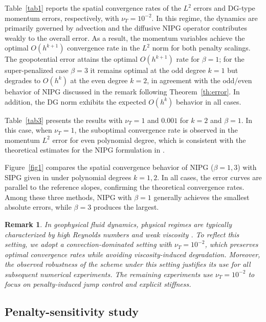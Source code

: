 \documentclass[pdflatex,sn-mathphys-num]{sn-jnl}%
\theoremstyle{thmstyleone}%
\theoremstyle{thmstyletwo}%
\newtheorem{remark}{Remark}%
\theoremstyle{thmstylethree}%
\begin{document}
Table~\ref{tab1} reports the spatial convergence rates of the $L^2$ errors and DG-type momentum errors, respectively, with $\nu_{T}=10^{-2}$. 
In this regime, the dynamics are primarily governed by advection and the diffusive NIPG operator contributes weakly to the overall error. 
As a result, the momentum variables achieve the optimal $O(h^{k+1})$ convergence rate in the $L^2$ norm for both penalty scalings. 
The geopotential error attains the optimal $O(h^{k+1})$ rate for $\beta=1$; for the super-penalized case $\beta=3$ it remains optimal at the odd degree $k=1$ but degrades to $O(h^{k})$ at the even degree $k=2$, in agreement with the odd/even behavior of NIPG discussed in the remark following Theorem~\ref{th:error}. In addition, the DG norm exhibits the expected $O(h^{k})$ behavior in all cases.

Table~\ref{tab3} presents the results with $\nu_{T}=1$ and $0.001$ for $k=2$ and $\beta=1$. In this case, when $\nu_{T}=1$, the suboptimal convergence rate is observed in the momentum $L^2$ error for even polynomial degree, which is consistent with the theoretical estimates for the NIPG formulation in \cite{ref_article2}.

Figure~\ref{fig1} compares the spatial convergence behavior of NIPG ($\beta=1,3$) with SIPG given in \cite{ref_article4} under polynomial degrees $k=1,2$. In all cases, the error curves are parallel to the reference slopes, confirming the theoretical convergence rates. Among these three methods, NIPG with $\beta=1$ generally achieves the smallest absolute errors, while $\beta=3$ produces the largest.

\begin{remark}
In geophysical fluid dynamics, physical regimes are typically characterized by high Reynolds numbers and weak viscosity \cite{Pedlosky2013}. 
To reflect this setting, we adopt a convection-dominated setting with $\nu_T=10^{-2}$, which preserves optimal convergence rates while avoiding viscosity-induced degradation. Moreover, the observed robustness of the scheme under this setting justifies its use for all subsequent numerical experiments.
The remaining experiments use $\nu_T=10^{-2}$ to focus on penalty-induced jump control and explicit stiffness.
\end{remark}

\subsection{Penalty-sensitivity study}
\label{sec:penalty-sensitivity}
\end{document}
